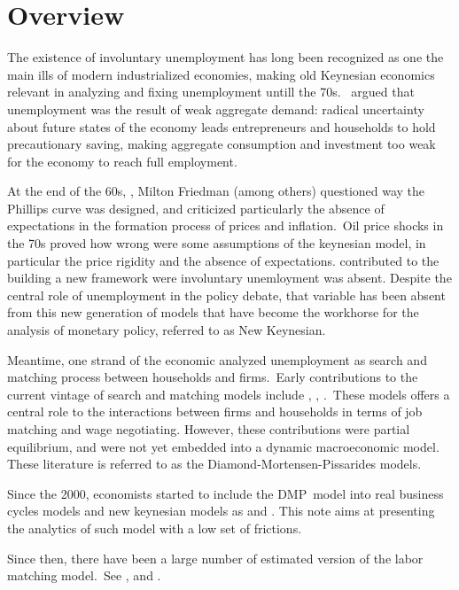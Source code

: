 \documentclass[a4paper,12pt]{article}%
\begin{document}
\FRONTPAGE


\section{Overview}

The existence of involuntary unemployment has long been recognized as one the
main ills of modern industrialized economies, making old Keynesian economics
relevant in analyzing and fixing unemployment untill the
70s.\ \cite{keynes1937general} argued that unemployment was the result of weak
aggregate demand: radical uncertainty about future states of the economy leads
entrepreneurs and households to hold precautionary saving, making aggregate
consumption and investment too weak for the economy to reach full employment.

At the end of the 60s, \cite{phelps1967phillips}, Milton Friedman (among
others) questioned way the Phillips curve was designed, and criticized
particularly the absence of expectations in the formation process of prices
and inflation.\ Oil price shocks in the 70s proved how wrong were some
assumptions of the keynesian model, in particular the price rigidity and the
absence of expectations. \cite{lucas1976econometric} contributed to the
building a new framework were involuntary unemloyment was absent. Despite the
central role of unemployment in the policy debate, that variable has been
absent from this new generation of models that have become the workhorse for
the analysis of monetary policy, referred to as New Keynesian.

Meantime, one strand of the economic analyzed unemployment as search and
matching process between households and firms.\ Early contributions to the
current vintage of search and matching models include
\cite{diamond1982aggregate}, \cite{diamond1982wage},
\cite{mortensen1982matching} \cite{pissarides1984search}.\ These models offers
a central role to the interactions between firms and households in terms of
job matching and wage negotiating. However, these contributions were partial
equilibrium, and were not yet embedded into a dynamic macroeconomic model.
These literature is referred to as the Diamond-Mortensen-Pissarides models.

Since the 2000, economists started to include the DMP\ model into real
business cycles models and new keynesian models as \cite{shimer2005cyclical}
and \cite{hall2005employment}. This note aims at presenting the analytics of
such model with a low set of frictions.

Since then, there have been a large number of estimated version of the labor
matching model.\ See \cite{gertler2009unemployment},
\cite{gali2012unemployment} and \cite{christiano2016unemployment}.
\end{document}
